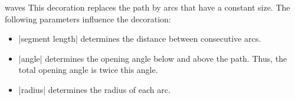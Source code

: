 \begin{decoration}{waves}
    This decoration replaces the path by arcs that have a constant size. The
    following parameters influence the decoration:
    \begin{itemize}
        \item |segment length| determines the distance between consecutive
            arcs.
        \item |angle| determines the opening angle below and above the path.
            Thus, the total opening angle is twice this angle.
        \item |radius| determines the radius of each arc.
    \end{itemize}
\begin{codeexample}[preamble={\usetikzlibrary{decorations.pathreplacing}}]
\end{codeexample}
\end{decoration}

